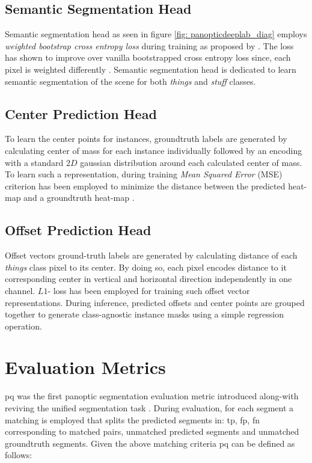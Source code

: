 \subsection{Semantic Segmentation Head}
Semantic segmentation head as seen in figure \ref{fig: panopticdeeplab_diag} employs \textit{weighted bootstrap cross entropy loss} during training as proposed by \cite{DBLPDeeperLab:journals/corr/abs-1902-05093}. The loss has shown to improve over vanilla bootstrapped cross entropy loss since, each pixel is weighted differently \cite{DBLP:journals/corr/WuSH16b}. Semantic segmentation head is dedicated to learn semantic segmentation of the scene for both \textit{things} and \textit{stuff} classes. 

\subsection{Center Prediction Head}

To learn the center points for instances, groundtruth labels are generated by calculating center of mass for each instance individually followed by an encoding with a standard $2D$ gaussian distribution around each calculated center of mass. To learn such a representation, during training \textit{ Mean Squared Error} (MSE) criterion has been employed to minimize the distance between the predicted heat-map and a groundtruth heat-map \cite{DBLP:journals/corr/TompsonJLB14}. 

\subsection{Offset Prediction Head}

Offset vectors ground-truth labels are generated by calculating distance of each \textit{things} class pixel to its center. By doing so, each pixel encodes distance to it corresponding center in vertical and horizontal direction independently in one channel. $L1$- loss has been employed for training such offset vector representations. During inference, predicted offsets and center points are grouped together to generate class-agnostic instance masks using a simple regression operation.


\section{Evaluation Metrics}


\gls{pq} was the first panoptic segmentation evaluation metric introduced along-with reviving the unified segmentation task \cite{DBLP_panootic_seg:journals/corr/abs-1801-00868}. During evaluation, for each segment a matching is employed that splits the predicted segments in: \gls{tp}, \gls{fp}, \gls{fn} corresponding to matched pairs, unmatched predicted segments and unmatched groundtruth segments. Given the above matching criteria \gls{pq} can be defined as follows:

